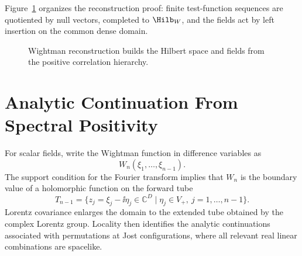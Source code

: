Figure~\ref{fig:wightman-reconstruction} organizes the reconstruction proof:
finite test-function sequences are quotiented by null vectors, completed to
\(\Hilb_W\), and the fields act by left insertion on the common dense domain.

\begin{figure}[H]
  \centering
  \caption{Wightman reconstruction builds the Hilbert space and fields from the
  positive correlation hierarchy.}
  \label{fig:wightman-reconstruction}
\end{figure}

\section{Analytic Continuation From Spectral Positivity}

For scalar fields, write the Wightman function in difference variables as
\[
  W_n(\xi_1,\ldots,\xi_{n-1}).
\]
The support condition for the Fourier transform implies that \(W_n\) is the
boundary value of a holomorphic function on the forward tube
\[
  T_{n-1}
  =
  \{z_j=\xi_j-\ii\eta_j\in\mathbb C^D
  \mid \eta_j\in V_+,\ j=1,\ldots,n-1\}.
\]
Lorentz covariance enlarges the domain to the extended tube obtained by the
complex Lorentz group.  Locality then identifies the analytic continuations
associated with permutations at Jost configurations, where all relevant real
linear combinations are spacelike.

